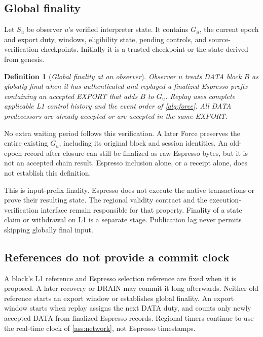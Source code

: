 \documentclass[11pt,a4paper]{article}
\newcommand{\defterm}[1]{\textcolor{rrBlue}{\textit{#1}}}
\newtheorem{definition}{Definition}[section]
\begin{document}
\subsection{Global finality}
\label{sec:global-finality}
Let $S_u$ be observer $u$'s verified interpreter state. It contains $G_u$,
the current epoch and export duty, windows, eligibility state, pending
controls, and source-verification checkpoints.
Initially it is a trusted checkpoint or the state derived from genesis.

\begin{definition}[\defterm{Global finality at an observer}]
\label{def:global-finality}
Observer $u$ treats DATA block $B$ as globally final when it has
authenticated and replayed a finalized Espresso prefix containing an
accepted EXPORT that adds $B$ to $G_u$. Replay uses complete applicable
L1 control history and the event order of \cref{alg:force}. All DATA
predecessors are already accepted or are accepted in the same EXPORT.
\end{definition}

No extra waiting period follows this verification. A later Force
preserves the entire existing $G_u$, including its original block and
session identities. An old-epoch record after closure can still be
finalized as raw Espresso bytes, but it is not an accepted chain result.
Espresso inclusion alone, or a receipt alone, does not establish this
definition.

This is input-prefix finality. Espresso does not execute the native
transactions or prove their resulting state. The regional validity
contract and the execution-verification interface remain responsible
for that property. Finality of a state claim or withdrawal on L1 is a
separate stage. Publication lag never permits skipping globally final
input.

\subsection{References do not provide a commit clock}
\label{sec:late-receipt}
A block's L1 reference and Espresso selection reference are fixed when
it is proposed. A later recovery or DRAIN may commit it long afterwards.
Neither old reference starts an export window or establishes global
finality. An export window starts when replay assigns the next DATA
duty, and counts only newly accepted DATA from finalized Espresso
records. Regional timers continue to use the real-time clock of
\cref{ass:network}, not Espresso timestamps.
\end{document}
